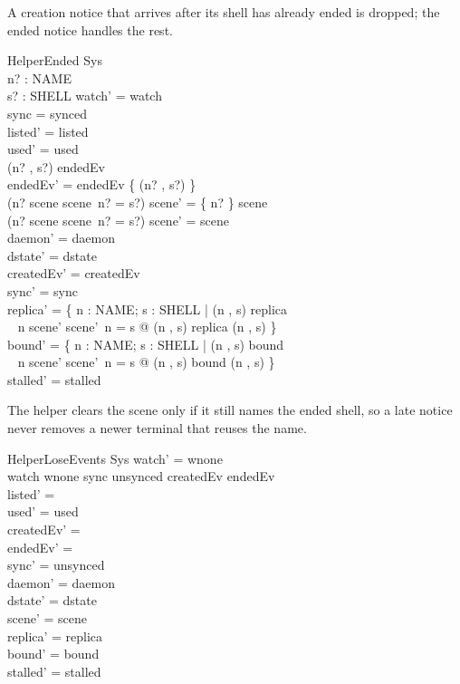 \documentclass[a4paper,10pt,fleqn]{article}
\begin{document}
A creation notice that arrives after its shell has already ended is
dropped; the ended notice handles the rest.

\begin{schema}{HelperEnded}
  \Delta Sys \\
  n? : NAME \\
  s? : SHELL
\where
  watch' = watch \\
  sync = synced \\
  listed' = listed \\
  used' = used \\
  (n? , s?) \in endedEv \\
  endedEv' = endedEv \setminus \{ (n? , s?) \} \\
  (n? \in \dom scene \land scene~n? = s?) \implies
    scene' = \{ n? \} \ndres scene \\
  \lnot (n? \in \dom scene \land scene~n? = s?) \implies
    scene' = scene \\
  daemon' = daemon \\
  dstate' = dstate \\
  createdEv' = createdEv \\
  sync' = sync \\
  replica' = \{ n : NAME; s : SHELL | (n , s) \in \dom replica \\
    \quad~ \land n \in \dom scene' \land scene'~n = s @ (n , s) \mapsto replica (n , s) \} \\
  bound' = \{ n : NAME; s : SHELL | (n , s) \in \dom bound \\
    \quad~ \land n \in \dom scene' \land scene'~n = s @ (n , s) \mapsto bound (n , s) \} \\
  stalled' = stalled
\end{schema}

The helper clears the scene only if it still names the ended shell, so
a late notice never removes a newer terminal that reuses the name.

\begin{schema}{HelperLoseEvents}
  \Delta Sys
\where
  watch' = wnone \\
  watch \neq wnone \lor sync \neq unsynced \lor
    createdEv \neq \emptyset \lor endedEv \neq \emptyset \\
  listed' = \emptyset \\
  used' = used \\
  createdEv' = \emptyset \\
  endedEv' = \emptyset \\
  sync' = unsynced \\
  daemon' = daemon \\
  dstate' = dstate \\
  scene' = scene \\
  replica' = replica \\
  bound' = bound \\
  stalled' = stalled
\end{schema}
\end{document}
